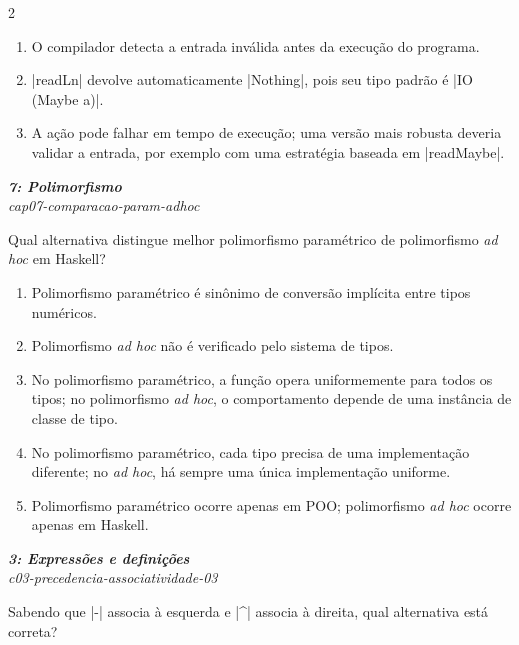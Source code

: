 \documentclass[a4paper,10pt,brazil]{article}
\begin{document}
\begin{multicols}{2}
\begin{enumerate}
  \item O compilador detecta a entrada inválida antes da execução do programa.

  \item \haskellinline|readLn| devolve automaticamente \haskellinline|Nothing|, pois seu tipo padrão é \haskellinline|IO (Maybe a)|.

  \item A ação pode falhar em tempo de execução; uma versão mais robusta deveria validar a entrada, por exemplo com uma estratégia baseada em \haskellinline|readMaybe|.


\end{enumerate}

\begin{flushright}
  \footnotesize
  \textit{\textbf{7: Polimorfismo}}\\
  \textit{cap07-comparacao-param-adhoc}\\

\end{flushright}
Qual alternativa distingue melhor polimorfismo paramétrico de polimorfismo \emph{ad hoc} em Haskell?
\begin{enumerate}
  \item Polimorfismo paramétrico é sinônimo de conversão implícita entre tipos numéricos.
  \item Polimorfismo \emph{ad hoc} não é verificado pelo sistema de tipos.
  \item No polimorfismo paramétrico, a função opera uniformemente para todos os tipos; no polimorfismo \emph{ad hoc}, o comportamento depende de uma instância de classe de tipo.
  \item No polimorfismo paramétrico, cada tipo precisa de uma implementação diferente; no \emph{ad hoc}, há sempre uma única implementação uniforme.
  \item Polimorfismo paramétrico ocorre apenas em POO; polimorfismo \emph{ad hoc} ocorre apenas em Haskell.

\end{enumerate}

\begin{flushright}
  \footnotesize
  \textit{\textbf{3: Expressões e definições}}\\
  \textit{c03-precedencia-associatividade-03}\\

\end{flushright}
Sabendo que \haskellinline|-| associa à esquerda e \haskellinline|^| associa à direita, qual alternativa está correta?


\end{multicols}
\end{document}
